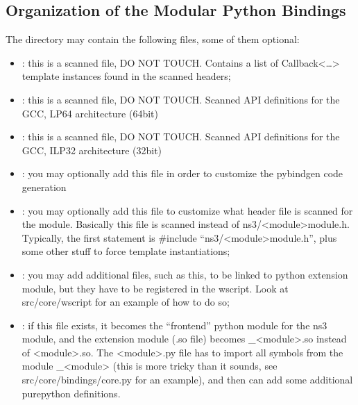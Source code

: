 \documentclass[letterpaper,10pt,english]{sphinxmanual}
\renewcommand{\sphinxcode}[1]{\texttt{\small{#1}}}
\begin{document}
\subsection{Organization of the Modular Python Bindings}
\label{\detokenize{python:organization-of-the-modular-python-bindings}}
The \sphinxcode{\sphinxupquote{src/\textless{}module\textgreater{}/bindings}} directory may contain the following files, some of them optional:
\begin{itemize}
\item {} 
\sphinxcode{}: this is a scanned file, DO NOT TOUCH.  Contains a list of Callback\textless{}…\textgreater{} template instances found in the scanned headers;

\item {} 
\sphinxcode{}: this is a scanned file, DO NOT TOUCH.  Scanned API definitions for the GCC, LP64 architecture (64\sphinxhyphen{}bit)

\item {} 
\sphinxcode{}: this is a scanned file, DO NOT TOUCH.  Scanned API definitions for the GCC, ILP32 architecture (32\sphinxhyphen{}bit)

\item {} 
\sphinxcode{}: you may optionally add this file in order to customize the pybindgen code generation

\item {} 
\sphinxcode{}: you may optionally add this file to customize what header file is scanned for the module.  Basically this file is scanned instead of ns3/\textless{}module\textgreater{}\sphinxhyphen{}module.h.  Typically, the first statement is \#include “ns3/\textless{}module\textgreater{}\sphinxhyphen{}module.h”, plus some other stuff to force template instantiations;

\item {} 
\sphinxcode{}: you may add additional files, such as this, to be linked to python extension module, but they have to be registered in the wscript. Look at src/core/wscript for an example of how to do so;

\item {} 
\sphinxcode{}: if this file exists, it becomes the “frontend” python module for the ns3 module, and the extension module (.so file) becomes \_\textless{}module\textgreater{}.so instead of \textless{}module\textgreater{}.so.  The \textless{}module\textgreater{}.py file has to import all symbols from the module \_\textless{}module\textgreater{} (this is more tricky than it sounds, see src/core/bindings/core.py for an example), and then can add some additional pure\sphinxhyphen{}python definitions.

\end{itemize}
\end{document}
